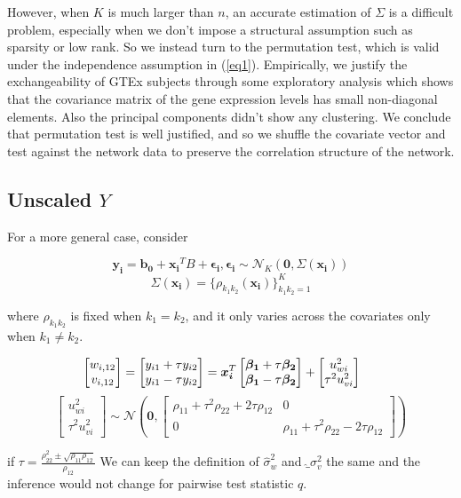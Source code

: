 \documentclass[12pt]{article}
\theoremstyle{theorem}
\begin{document}
\noindent However, when $K$ is much larger than $n$, an accurate estimation of $\Sigma$ is a difficult problem, especially when we don't impose a structural assumption such as sparsity or low rank. So we instead turn to the permutation test, which is valid under the independence assumption in (\ref{eq1}). Empirically, we justify the exchangeability of GTEx subjects through some exploratory analysis which shows that the covariance matrix of the gene expression levels has small non-diagonal elements. Also the principal components didn't show any clustering. We conclude that permutation test is well justified, and so we shuffle the covariate vector and test against the network data to preserve the correlation structure of the network. 

\subsection{Unscaled $Y$}
For a more general case, consider
\begin{singlespace}
\begin{equation}
\bm{y_i} = \bm{b_0} + \bm{x_i}^TB + \bm{\epsilon_i}, \bm{\epsilon_i} \sim \mathcal{N}_K(\bm{0}, \Sigma(\bm{x_i}))
\label{eq_general}
\end{equation}
$$\Sigma (\bm{x_i}) = \{\rho_{k_1k_2}(\bm{x_i})\}_{k_1k_2 = 1}^K$$
\end{singlespace}
\noindent where $\rho_{k_1 k_2}$ is fixed when $k_1 = k_2$, and it only varies across the covariates only when $k_1 \neq k_2$.
\begin{singlespace}
$$\hspace{-5mm} \begin{bmatrix} w_{i,12} \\ v_{i,12} \end{bmatrix} = 
\begin{bmatrix} y_{i1} + \tau y_{i2} \\ y_{i1} - \tau y_{i2} \end{bmatrix} = 
 \bm{x_i}^T \begin{bmatrix} \bm{\beta_1} + \tau \bm{\beta_2} \\ \bm{\beta_1} - \tau \bm{\beta_2}\end{bmatrix} + \begin{bmatrix} u_{wi}^2 \\ \tau^2 u_{vi}^2\end{bmatrix}$$
 $$\begin{bmatrix} u_{wi}^2 \\ \tau^2 u_{vi}^2\end{bmatrix} \sim  \mathcal{N} \left( \bm{0}, \begin{bmatrix} \rho_{11} + \tau^2 \rho_{22} + 2\tau \rho_{12} & 0 \\ 0 & \rho_{11} + \tau^2 \rho_{22} - 2\tau \rho_{12} \end{bmatrix} \right)$$
 \label{transformed_model_general}
\end{singlespace}
if $\tau = \frac{\rho_{22}^2 \pm \sqrt{\rho_{11}\rho_{12}}}{\rho_{12}}$
\noindent We can keep the definition of $\hat{\sigma}_w^2$ and $\hat_{\sigma}_v^2$ the same and the inference would not change for pairwise test statistic $q$.
\end{document}

